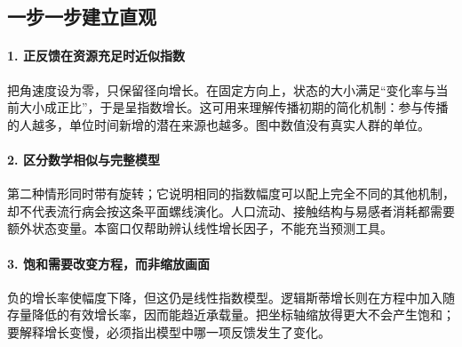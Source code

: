 \subsection*{一步一步建立直观}

\paragraph{1. 正反馈在资源充足时近似指数}

把角速度设为零，只保留径向增长。在固定方向上，状态的大小满足“变化率与当前大小成正比”，于是呈指数增长。这可用来理解传播初期的简化机制：参与传播的人越多，单位时间新增的潜在来源也越多。图中数值没有真实人群的单位。



\paragraph{2. 区分数学相似与完整模型}

第二种情形同时带有旋转；它说明相同的指数幅度可以配上完全不同的其他机制，却不代表流行病会按这条平面螺线演化。人口流动、接触结构与易感者消耗都需要额外状态变量。本窗口仅帮助辨认线性增长因子，不能充当预测工具。



\paragraph{3. 饱和需要改变方程，而非缩放画面}

负的增长率使幅度下降，但这仍是线性指数模型。逻辑斯蒂增长则在方程中加入随存量降低的有效增长率，因而能趋近承载量。把坐标轴缩放得更大不会产生饱和；要解释增长变慢，必须指出模型中哪一项反馈发生了变化。
